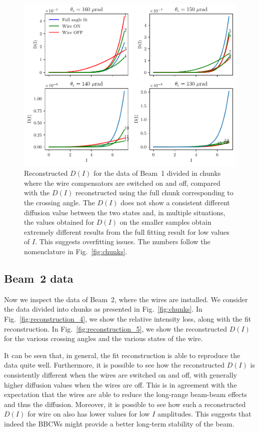 \begin{figure}[ht]
    \centering
    \includegraphics[width=1.0\textwidth]{5_wire_compensators_LHC/figs/fokker_planck_b1_turbo_bis.pdf}
    \caption{Reconstructed $D(I)$ for the data of Beam~1 divided in chunks where the wire compensators are switched on and off, compared with the $D(I)$ reconstructed using the full chunk corresponding to the crossing angle. The $D(I)$ does not show a consistent different diffusion value between the two states and, in multiple situations, the values obtained for $D(I)$ on the smaller samples obtain extremely different results from the full fitting result for low values of $I$. This suggests overfitting issues. The numbers follow the nomenclature in Fig.~\ref{fig:chunks}.}
    \label{fig:reconstruction_3}
\end{figure}


\subsection*{Beam~2 data}

Now we inspect the data of Beam~2, where the wires are installed. We consider the data divided into chunks as presented in Fig.~\ref{fig:chunks}. In Fig.~\ref{fig:reconstruction_4}, we show the relative intensity loss, along with the fit reconstruction. In Fig.~\ref{fig:reconstruction_5}, we show the reconstructed $D(I)$ for the various crossing angles and the various states of the wire.

It can be seen that, in general, the fit reconstruction is able to reproduce the data quite well. Furthermore, it is possible to see how the reconstructed $D(I)$ is consistently different when the wires are switched on and off, with generally higher diffusion values when the wires are off. This is in agreement with the expectation that the wires are able to reduce the long-range beam-beam effects and thus the diffusion. Moreover, it is possible to see how such a reconstructed $D(I)$ for wire on  also has lower values for low $I$ amplitudes. This suggests that indeed the BBCWs might provide a better long-term stability of the beam.

